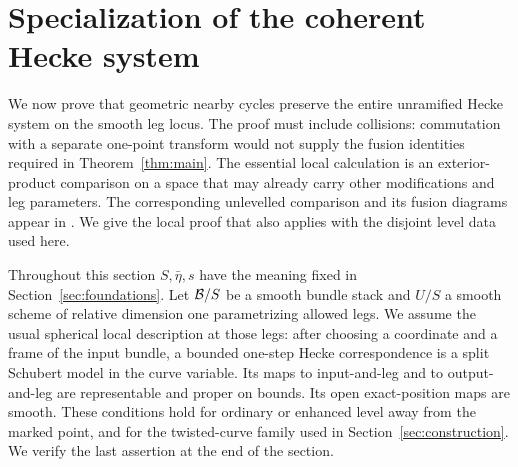 \section{Specialization of the coherent Hecke system}
\label{sec:specialization}

We now prove that geometric nearby cycles preserve the entire unramified
Hecke system on the smooth leg locus.  The proof must include collisions:
commutation with a separate one-point transform would not supply the
fusion identities required in Theorem~\ref{thm:main}.  The essential local
calculation is an exterior-product comparison on a space that may already
carry other modifications and leg parameters.  The corresponding
unlevelled comparison and its fusion diagrams appear in
\cite[Proposition~4.2.5 and \S4.2.6]{GR}.  We give the local proof that
also applies with the disjoint level data used here.

Throughout this section $S,\bar\eta,s$ have the meaning fixed in
Section~\ref{sec:foundations}.  Let $\mathcal B/S$ be a smooth bundle stack and
$U/S$ a smooth scheme of relative dimension one parametrizing allowed
legs.  We assume the usual spherical local description at those legs:
after choosing a coordinate and a frame of the input bundle, a bounded
one-step Hecke correspondence is a split Schubert model in the curve
variable.  Its maps to input-and-leg and to output-and-leg are
representable and proper on bounds.  Its open exact-position maps are
smooth.  These conditions hold for ordinary or enhanced level away from
the marked point, and for the twisted-curve family used in
Section~\ref{sec:construction}.  We verify the last assertion at the end
of the section.

